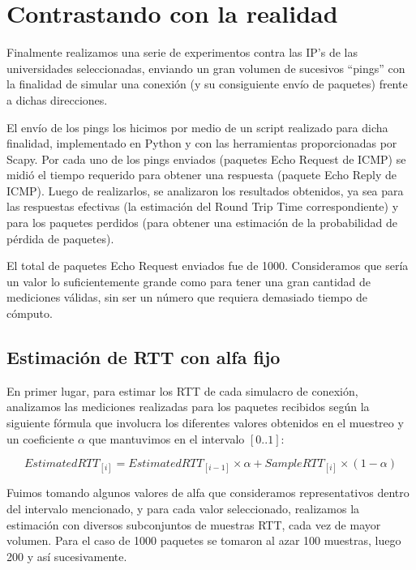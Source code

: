 \section{Contrastando con la realidad}

Finalmente realizamos una serie de experimentos contra las IP's de las universidades seleccionadas, enviando un gran volumen de sucesivos ``pings'' con la finalidad de simular una conexión (y su consiguiente envío de paquetes) frente a dichas direcciones.

El envío de los pings los hicimos por medio de un script realizado para dicha finalidad, implementado en Python y con las herramientas proporcionadas por Scapy. Por cada uno de los pings enviados (paquetes Echo Request de ICMP) se midió el tiempo requerido para obtener una respuesta (paquete Echo Reply de ICMP). Luego de realizarlos, se analizaron los resultados obtenidos, ya sea para las respuestas efectivas (la estimación del Round Trip Time correspondiente) y para los paquetes perdidos (para obtener una estimación de la probabilidad de pérdida de paquetes). 

El total de paquetes Echo Request enviados fue de 1000. Consideramos que sería un valor lo suficientemente grande como para tener una gran cantidad de mediciones válidas, sin ser un número que requiera demasiado tiempo de cómputo.

\subsection{Estimación de RTT con alfa fijo}

En primer lugar, para estimar los RTT de cada simulacro de conexión, analizamos las mediciones realizadas para los paquetes recibidos según la siguiente fórmula que involucra los diferentes valores obtenidos en el muestreo y un coeficiente $\alpha$ que mantuvimos en el intervalo $[0..1]$:

\begin{equation}
EstimatedRTT_{[i]} = EstimatedRTT_{[i - 1]} \times \alpha + SampleRTT_{[i]} \times (1 - \alpha)
\end{equation}

Fuimos tomando algunos valores de alfa que consideramos representativos dentro del intervalo mencionado, y para cada 
valor seleccionado, realizamos la estimación con diversos subconjuntos de muestras RTT, cada vez de mayor volumen. Para el caso de 1000 paquetes se tomaron al azar 100 muestras, luego 200 y así sucesivamente.

